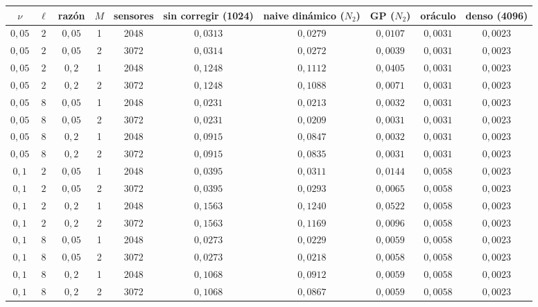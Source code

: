 \begin{tabular}{cccccccccc}
\toprule
$\nu$ & $\ell$ & razón & $M$ & sensores & sin corregir (1024) & naive dinámico ($N_2$) & GP ($N_2$) & oráculo & denso (4096) \\
\midrule
$0{,}05$ & $2$ & $0{,}05$ & 1 & 2048 & $0{,}0313$ & $0{,}0279$ & $0{,}0107$ & $0{,}0031$ & $0{,}0023$ \\
$0{,}05$ & $2$ & $0{,}05$ & 2 & 3072 & $0{,}0314$ & $0{,}0272$ & $0{,}0039$ & $0{,}0031$ & $0{,}0023$ \\
\midrule
$0{,}05$ & $2$ & $0{,}2$ & 1 & 2048 & $0{,}1248$ & $0{,}1112$ & $0{,}0405$ & $0{,}0031$ & $0{,}0023$ \\
$0{,}05$ & $2$ & $0{,}2$ & 2 & 3072 & $0{,}1248$ & $0{,}1088$ & $0{,}0071$ & $0{,}0031$ & $0{,}0023$ \\
\midrule
$0{,}05$ & $8$ & $0{,}05$ & 1 & 2048 & $0{,}0231$ & $0{,}0213$ & $0{,}0032$ & $0{,}0031$ & $0{,}0023$ \\
$0{,}05$ & $8$ & $0{,}05$ & 2 & 3072 & $0{,}0231$ & $0{,}0209$ & $0{,}0031$ & $0{,}0031$ & $0{,}0023$ \\
\midrule
$0{,}05$ & $8$ & $0{,}2$ & 1 & 2048 & $0{,}0915$ & $0{,}0847$ & $0{,}0032$ & $0{,}0031$ & $0{,}0023$ \\
$0{,}05$ & $8$ & $0{,}2$ & 2 & 3072 & $0{,}0915$ & $0{,}0835$ & $0{,}0031$ & $0{,}0031$ & $0{,}0023$ \\
\midrule
$0{,}1$ & $2$ & $0{,}05$ & 1 & 2048 & $0{,}0395$ & $0{,}0311$ & $0{,}0144$ & $0{,}0058$ & $0{,}0023$ \\
$0{,}1$ & $2$ & $0{,}05$ & 2 & 3072 & $0{,}0395$ & $0{,}0293$ & $0{,}0065$ & $0{,}0058$ & $0{,}0023$ \\
\midrule
$0{,}1$ & $2$ & $0{,}2$ & 1 & 2048 & $0{,}1563$ & $0{,}1240$ & $0{,}0522$ & $0{,}0058$ & $0{,}0023$ \\
$0{,}1$ & $2$ & $0{,}2$ & 2 & 3072 & $0{,}1563$ & $0{,}1169$ & $0{,}0096$ & $0{,}0058$ & $0{,}0023$ \\
\midrule
$0{,}1$ & $8$ & $0{,}05$ & 1 & 2048 & $0{,}0273$ & $0{,}0229$ & $0{,}0059$ & $0{,}0058$ & $0{,}0023$ \\
$0{,}1$ & $8$ & $0{,}05$ & 2 & 3072 & $0{,}0273$ & $0{,}0218$ & $0{,}0058$ & $0{,}0058$ & $0{,}0023$ \\
\midrule
$0{,}1$ & $8$ & $0{,}2$ & 1 & 2048 & $0{,}1068$ & $0{,}0912$ & $0{,}0059$ & $0{,}0058$ & $0{,}0023$ \\
$0{,}1$ & $8$ & $0{,}2$ & 2 & 3072 & $0{,}1068$ & $0{,}0867$ & $0{,}0059$ & $0{,}0058$ & $0{,}0023$ \\
\bottomrule
\end{tabular}
